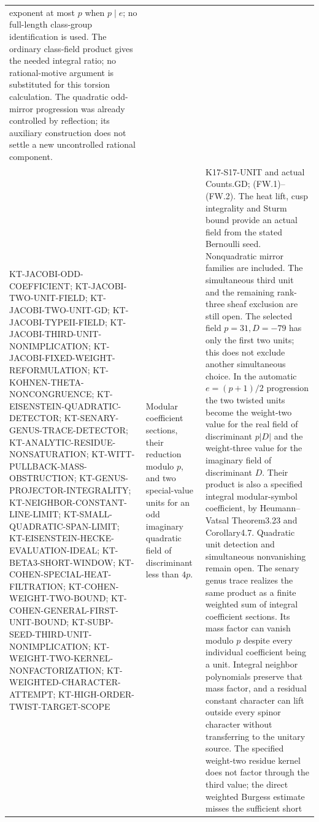 \documentclass[11pt,a4paper]{article}
\theoremstyle{definition}
\begin{document}
\begin{longtable}{>{\raggedright\arraybackslash}p{}
>{\raggedright\arraybackslash}p{}
>{\raggedright\arraybackslash}p{}}
exponent at most $p$ when $p\mid e$; no full-length
class-group identification is used. The ordinary class-field
product gives the needed integral ratio; no rational-motive
argument is substituted for this torsion calculation. The
quadratic odd-mirror progression was already controlled by
reflection; its auxiliary construction does not settle a new
uncontrolled rational component.\\
KT-JACOBI-ODD-COEFFICIENT;
KT-JACOBI-TWO-UNIT-FIELD;
KT-JACOBI-TWO-UNIT-GD; KT-JACOBI-TYPEII-FIELD;
KT-JACOBI-THIRD-UNIT-NONIMPLICATION;
KT-JACOBI-FIXED-WEIGHT-REFORMULATION;
KT-KOHNEN-THETA-NONCONGRUENCE;
KT-EISENSTEIN-QUADRATIC-DETECTOR;
KT-SENARY-GENUS-TRACE-DETECTOR;
KT-ANALYTIC-RESIDUE-NONSATURATION;
KT-WITT-PULLBACK-MASS-OBSTRUCTION;
KT-GENUS-PROJECTOR-INTEGRALITY;
KT-NEIGHBOR-CONSTANT-LINE-LIMIT;
KT-SMALL-QUADRATIC-SPAN-LIMIT;
KT-EISENSTEIN-HECKE-EVALUATION-IDEAL;
KT-BETA3-SHORT-WINDOW;
KT-COHEN-SPECIAL-HEAT-FILTRATION;
KT-COHEN-WEIGHT-TWO-BOUND;
KT-COHEN-GENERAL-FIRST-UNIT-BOUND;
KT-SUBP-SEED-THIRD-UNIT-NONIMPLICATION;
KT-WEIGHT-TWO-KERNEL-NONFACTORIZATION;
KT-WEIGHTED-CHARACTER-ATTEMPT;
KT-HIGH-ORDER-TWIST-TARGET-SCOPE &
Modular coefficient sections, their reduction modulo $p$,
and two special-value units for an odd imaginary quadratic
field of discriminant less than $4p$. &
K17-S17-UNIT and actual Counts.GD; (FW.1)--(FW.2).
The heat lift, cusp integrality and Sturm bound provide an
actual field from the stated Bernoulli seed. Nonquadratic
mirror families are included. The simultaneous third unit
and the remaining rank-three sheaf exclusion are still open.
The selected field $p=31,D=-79$ has only the first two units;
this does not exclude another simultaneous choice. In the
automatic $e=(p+1)/2$ progression the two twisted units become
the weight-two value for the real field of discriminant $p|D|$
and the weight-three value for the imaginary field of
discriminant $D$. Their product is also a specified integral modular-symbol coefficient,
by Heumann--Vatsal Theorem3.23 and Corollary4.7. Quadratic
unit detection and simultaneous nonvanishing remain open.
The senary genus trace realizes the same product as a finite
weighted sum of integral coefficient sections. Its mass factor
can vanish modulo $p$ despite every individual coefficient being
a unit. Integral neighbor polynomials preserve that mass factor,
and a residual constant character can lift outside every spinor
character without transferring to the unitary source. The specified
weight-two residue kernel does not factor through the third value;
the direct weighted Burgess estimate misses the sufficient short

\end{longtable}
\end{document}
